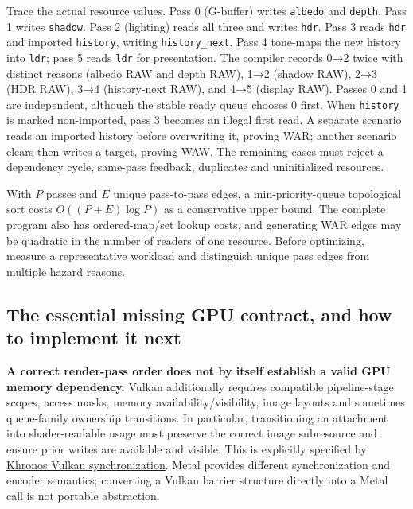Trace the actual resource values. Pass 0 (G-buffer) writes \texttt{albedo} and \texttt{depth}. Pass 1 writes \texttt{shadow}. Pass 2 (lighting) reads all three and writes \texttt{hdr}. Pass 3 reads \texttt{hdr} and imported \texttt{history}, writing \texttt{history\_next}. Pass 4 tone-maps the new history into \texttt{ldr}; pass 5 reads \texttt{ldr} for presentation. The compiler records 0→2 twice with distinct reasons (albedo RAW and depth RAW), 1→2 (shadow RAW), 2→3 (HDR RAW), 3→4 (history-next RAW), and 4→5 (display RAW). Passes 0 and 1 are independent, although the stable ready queue chooses 0 first. When \texttt{history} is marked non-imported, pass 3 becomes an illegal first read. A separate scenario reads an imported history before overwriting it, proving WAR; another scenario clears then writes a target, proving WAW. The remaining cases must reject a dependency cycle, same-pass feedback, duplicates and uninitialized resources.

With \(P\) passes and \(E\) unique pass-to-pass edges, a min-priority-queue topological sort costs \(O((P+E)\log P)\) as a conservative upper bound. The complete program also has ordered-map/set lookup costs, and generating WAR edges may be quadratic in the number of readers of one resource. Before optimizing, measure a representative workload and distinguish unique pass edges from multiple hazard reasons.

\subsection{The essential missing GPU contract, and how to implement it next}\label{06-engine-ii-ch042-the-essential-missing-gpu-contract-and-how-to-implement-it-next}

\textbf{A correct render-pass order does not by itself establish a valid GPU memory dependency.} Vulkan additionally requires compatible pipeline-stage scopes, access masks, memory availability/visibility, image layouts and sometimes queue-family ownership transitions. In particular, transitioning an attachment into shader-readable usage must preserve the correct image subresource and ensure prior writes are available and visible. This is explicitly specified by \href{https://docs.vulkan.org/spec/latest/chapters/synchronization.html}{Khronos Vulkan synchronization}. Metal provides different synchronization and encoder semantics; converting a Vulkan barrier structure directly into a Metal call is not portable abstraction.

